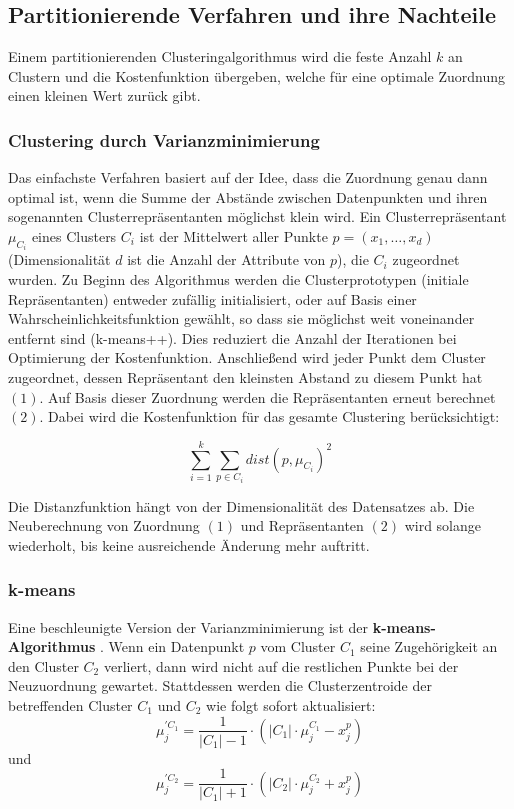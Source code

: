 \documentclass[11pt,ceqn]{book}
\begin{document}
\subsection{Partitionierende Verfahren und ihre Nachteile}
Einem partitionierenden Clusteringalgorithmus wird die feste Anzahl $k$ an Clustern und die Kostenfunktion übergeben, welche für eine optimale Zuordnung einen kleinen Wert zurück gibt.
\subsubsection{Clustering durch Varianzminimierung}
Das einfachste Verfahren basiert auf der Idee, dass die Zuordnung genau dann optimal ist, wenn die Summe der Abstände zwischen Datenpunkten und ihren sogenannten Clusterrepräsentanten möglichst klein wird. Ein Clusterrepräsentant $\mu_{C_i}$ eines Clusters $C_i$ ist der Mittelwert aller Punkte $p = (x_1,\dots,x_d)$ (Dimensionalität $d$ ist die Anzahl der Attribute von $p$), die $C_i$ zugeordnet wurden. Zu Beginn des Algorithmus werden die Clusterprototypen (initiale Repräsentanten) entweder zufällig initialisiert, oder auf Basis einer Wahrscheinlichkeitsfunktion gewählt, so dass sie möglichst weit voneinander entfernt sind (k-means++\cite{kmplus}). Dies reduziert die Anzahl der Iterationen bei Optimierung der Kostenfunktion. Anschließend wird jeder Punkt dem Cluster zugeordnet, dessen Repräsentant den kleinsten Abstand zu diesem Punkt hat $(1)$. Auf Basis dieser Zuordnung werden die Repräsentanten erneut berechnet $(2)$. Dabei wird die Kostenfunktion für das gesamte Clustering berücksichtigt:

$$\sum_{i=1}^{k}\sum_{p \in C_i}^{} dist(p,\mu_{C_i})^2$$

Die Distanzfunktion hängt von der Dimensionalität des Datensatzes ab. Die Neuberechnung von Zuordnung $(1)$ und Repräsentanten $(2)$ wird solange wiederholt, bis keine ausreichende Änderung mehr auftritt.

\subsubsection{k-means}

Eine beschleunigte Version der Varianzminimierung ist der \textbf{k-means-Algorithmus} \cite{forgy}. Wenn ein Datenpunkt $p$ vom Cluster $C_1$ seine Zugehörigkeit an den Cluster $C_2$ verliert, dann wird nicht auf die restlichen Punkte bei der Neuzuordnung gewartet. Stattdessen werden die Clusterzentroide der betreffenden Cluster $C_1$ und $C_2$ wie folgt sofort aktualisiert:
$$\mu_j^{' C_1} = \frac{1}{|C_1|-1}\cdot(|C_1|\cdot \mu_j^{C_1} - x_j^p)$$ und $$\mu_j^{' C_2} = \frac{1}{|C_1|+1}\cdot(|C_2|\cdot \mu_j^{C_2} + x_j^p)$$ 
\end{document}
